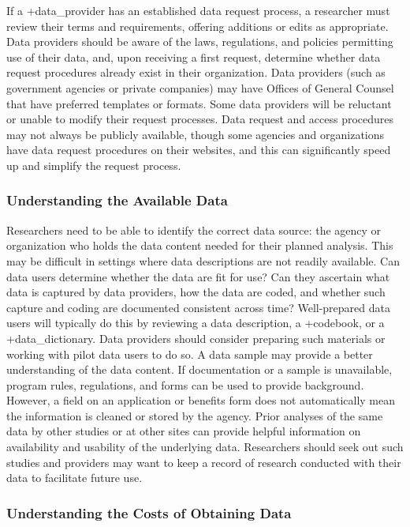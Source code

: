 \documentclass[
]{WileySix}
\begin{document}
If a +data\_provider\textbar{} has an established data request process, a researcher must review their terms and requirements, offering additions or edits as appropriate. Data providers should be aware of the laws, regulations, and policies permitting use of their data, and, upon receiving a first request, determine whether data request procedures already exist in their organization. Data providers (such as government agencies or private companies) may have Offices of General Counsel that have preferred templates or formats. Some data providers will be reluctant or unable to modify their request processes. Data request and access procedures may not always be publicly available, though some agencies and organizations have data request procedures on their websites, and this can significantly speed up and simplify the request process.

\hypertarget{understanding-the-available-data}{%
\subsubsection{Understanding the Available Data}\label{understanding-the-available-data}}

Researchers need to be able to identify the correct data source: the agency or organization who holds the data content needed for their planned analysis. This may be difficult in settings where data descriptions are not readily available. Can data users determine whether the data are fit for use? Can they ascertain what data is captured by data providers, how the data are coded, and whether such capture and coding are documented consistent across time? Well-prepared data users will typically do this by reviewing a data description, a +codebook\textbar, or a +data\_dictionary\textbar. Data providers should consider preparing such materials or working with pilot data users to do so. A data sample may provide a better understanding of the data content. If documentation or a sample is unavailable, program rules, regulations, and forms can be used to provide background. However, a field on an application or benefits form does not automatically mean the information is cleaned or stored by the agency. Prior analyses of the same data by other studies or at other sites can provide helpful information on availability and usability of the underlying data. Researchers should seek out such studies and providers may want to keep a record of research conducted with their data to facilitate future use.

\hypertarget{understanding-the-costs-of-obtaining-data}{%
\subsubsection{Understanding the Costs of Obtaining Data}\label{understanding-the-costs-of-obtaining-data}}
\end{document}
